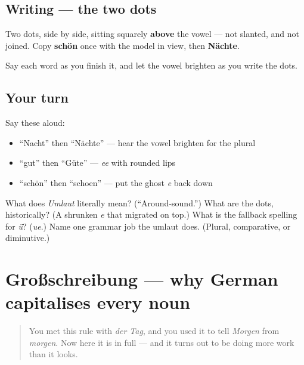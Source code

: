 \subsection*{Writing — the two dots}

Two dots, side by side, sitting squarely \textbf{above} the vowel — not slanted, and not joined. Copy \textbf{schön} once with the model in view, then \textbf{Nächte}.

Say each word as you finish it, and let the vowel brighten as you write the dots.

\subsection*{Your turn}
Say these aloud:

\begin{itemize}
\raggedright
  \item \textquotedblleft{}Nacht\textquotedblright{} then \textquotedblleft{}Nächte\textquotedblright{} — hear the vowel brighten for the plural
  \item \textquotedblleft{}gut\textquotedblright{} then \textquotedblleft{}Güte\textquotedblright{} — \emph{ee} with rounded lips
  \item \textquotedblleft{}schön\textquotedblright{} then \textquotedblleft{}schoen\textquotedblright{} — put the ghost \emph{e} back down
\end{itemize}

\begin{tcolorbox}[breakable,colback=teal!4,colframe=teal!35!black,title={Before you move on}]
What does \emph{Umlaut} literally mean? (\textquotedblleft{}Around-sound.\textquotedblright{}) What are the dots, historically? (A shrunken \emph{e} that migrated on top.) What is the fallback spelling for \emph{ü}? (\emph{ue}.) Name one grammar job the umlaut does. (Plural, comparative, or diminutive.)
\end{tcolorbox}
\section[Großschreibung]{Großschreibung — why German capitalises every noun}

\label{lesson:GE-W03-capitalization}



\begin{quote}
You met this rule with \emph{der Tag}, and you used it to tell \emph{Morgen} from \emph{morgen}. Now here it is in full — and it turns out to be doing more work than it looks.
\end{quote}

